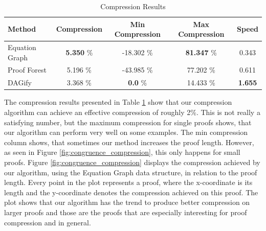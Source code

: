 
\begin{table}[h]
\centering
\begin{tabular}{l c c c c}
\toprule
\textbf{Method} & \textbf{Compression} & \textbf{Min Compression} & \textbf{Max Compression} & \textbf{Speed}\\ 
\midrule

Equation Graph & \textbf{5.350} \% & -18.302 \% & \textbf{81.347} \% & 0.343 \\ 
Proof Forest &  5.196 \% & -43.985 \% & 77.202 \% & 0.611 \\ 
DAGify & 3.368 \% & \textbf{0.0} \% & 14.433 \% & \textbf{1.655} \\ 

\bottomrule
\end{tabular}
\caption{Compression Results}
\label{tab:congruence_results}
\end{table}

The compression results presented in Table \ref{tab:congruence_results} show that our compression algorithm can achieve an effective compression of roughly 2\%.
This is not really a satisfying number, but the maximum compression for single proofs shows, that our algorithm can perform very well on some examples.
The min compression column shows, that sometimes our method increases the proof length.
However, as seen in Figure \ref{fig:congruence_compression}, this only happens for small proofs.
Figure \ref{fig:congruence_compression} displays the compression achieved by our algorithm, using the Equation Graph data structure, in relation to the proof length.
Every point in the plot represents a proof, where the x-coordinate is its length and the y-coordinate denotes the compression achieved on this proof.
The plot shows that our algorithm has the trend to produce better compression on larger proofs and those are the proofs that are especially interesting for proof compression and in general.

